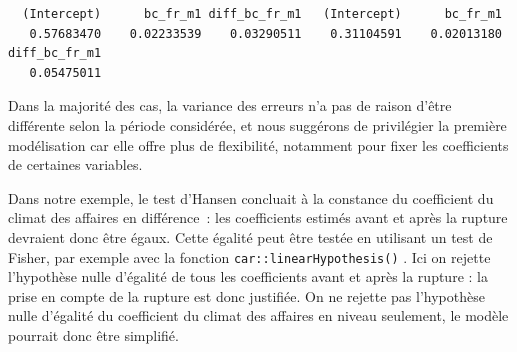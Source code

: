 \documentclass[
  a4paper,
  DIV=11,
  numbers=noendperiod,
  french]{scrartcl}
\newenvironment{Shaded}{\begin{snugshade}}{\end{snugshade}}
\newcommand{\AttributeTok}[1]{\textcolor[rgb]{0.40,0.45,0.13}{#1}}
\newcommand{\CommentTok}[1]{\textcolor[rgb]{0.37,0.37,0.37}{#1}}
\newcommand{\DecValTok}[1]{\textcolor[rgb]{0.68,0.00,0.00}{#1}}
\newcommand{\FunctionTok}[1]{\textcolor[rgb]{0.28,0.35,0.67}{#1}}
\newcommand{\NormalTok}[1]{\textcolor[rgb]{0.00,0.23,0.31}{#1}}
\newcommand{\SpecialCharTok}[1]{\textcolor[rgb]{0.37,0.37,0.37}{#1}}
\newcommand{\StringTok}[1]{\textcolor[rgb]{0.13,0.47,0.30}{#1}}
\newcommand\1{{\mathds 1}}
\theoremstyle{remark}
\begin{document}
\begin{Shaded}
\end{Shaded}

\begin{verbatim}
  (Intercept)      bc_fr_m1 diff_bc_fr_m1   (Intercept)      bc_fr_m1 
   0.57683470    0.02233539    0.03290511    0.31104591    0.02013180 
diff_bc_fr_m1 
   0.05475011 
\end{verbatim}

Dans la majorité des cas, la variance des erreurs n'a pas de raison
d'être différente selon la période considérée, et nous suggérons de
privilégier la première modélisation car elle offre plus de flexibilité,
notamment pour fixer les coefficients de certaines variables.

Dans notre exemple, le test d'Hansen concluait à la constance du
coefficient du climat des affaires en différence~: les coefficients
estimés avant et après la rupture devraient donc être égaux. Cette
égalité peut être testée en utilisant un test de Fisher, par exemple
avec la fonction \texttt{car::linearHypothesis()} \autocite{car}. Ici on
rejette l'hypothèse nulle d'égalité de tous les coefficients avant et
après la rupture : la prise en compte de la rupture est donc justifiée.
On ne rejette pas l'hypothèse nulle d'égalité du coefficient du climat
des affaires en niveau seulement, le modèle pourrait donc être
simplifié.

\begin{Shaded}
\end{Shaded}
\end{document}
